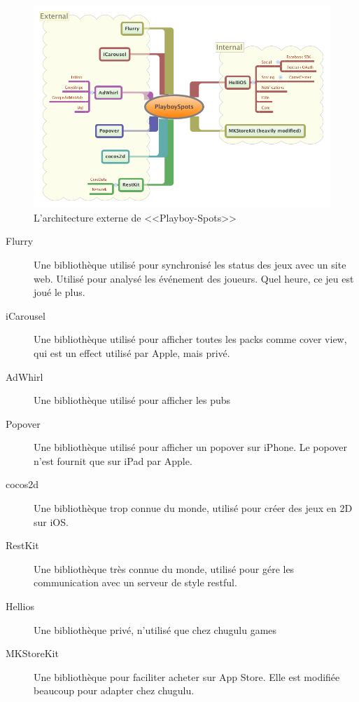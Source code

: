 \begin{figure}[htbp]
	\centering
		\includegraphics[width=7in]{XMinds/PlayboySpotsAppExternals.png}
	\caption{L'architecture externe de <<Playboy-Spots>>}
	\label{fig:XMinds_PlayboySpotsAppExternals}
\end{figure}

\begin{description}
	\item[Flurry] Une bibliothèque utilisé pour synchronisé les status des jeux avec un site web. Utilisé pour analysé les événement des joueurs. Quel heure, ce jeu est joué le plus.
	\item[iCarousel] Une bibliothèque utilisé pour afficher toutes les packs comme cover view, qui est un effect utilisé par Apple, mais privé.
	\item[AdWhirl] Une bibliothèque utilisé pour afficher les pubs
	\item[Popover] Une bibliothèque utilisé pour afficher un popover sur iPhone. Le popover n'est fournit que sur iPad par Apple.
	\item[cocos2d] Une bibliothèque trop connue du monde, utilisé pour créer des jeux en 2D sur iOS.
	\item[RestKit] Une bibliothèque très connue du monde, utilisé pour gére les communication avec un serveur de style restful.
	\item[Hellios] Une bibliothèque privé, n'utilisé que chez chugulu games
	\item[MKStoreKit] Une bibliothèque pour faciliter acheter sur App Store. Elle est modifiée beaucoup pour adapter chez chugulu.
\end{description}


